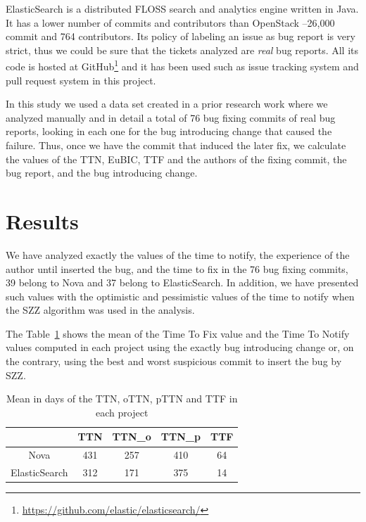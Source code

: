 \documentclass[10pt, conference]{IEEEtran}
\begin{document}
ElasticSearch is a distributed FLOSS search and analytics engine written in Java. It has a lower number of commits and contributors than OpenStack --26,000 commit and 764 contributors. Its policy of labeling an issue as bug report is very strict, thus we could be sure that the tickets analyzed are \emph{real} bug reports. All its code is hosted at GitHub\footnote{\url{https://github.com/elastic/elasticsearch/}} and it has been used such as issue tracking system and pull request system in this project.

In this study we used a data set created in a prior research work where we analyzed manually and in detail a total of 76 bug fixing commits of real bug reports, looking in each one for the bug introducing change that caused the failure. Thus, once we have the commit that induced the later fix, we calculate the values of the TTN, EuBIC, TTF and the authors of the fixing commit, the bug report, and the bug introducing change.  


\section{Results}
\label{sec:results}

We have analyzed exactly the values of the time to notify, the experience of the author until inserted the bug, and the time to fix in the 76 bug fixing commits, 39 belong to Nova and 37 belong to ElasticSearch. In addition, we have presented such values with the optimistic and pessimistic values of the time to notify when the SZZ algorithm was used in the analysis.

The Table~\ref{table} shows the mean of the Time To Fix value and the Time To Notify values computed in each project using the exactly bug introducing change or, on the contrary, using the best and worst suspicious commit to insert the bug by SZZ.  
\begin{table}[!t]
\renewcommand{\arraystretch}{1.3}
\label{table}
\centering
\caption{Mean in days of the TTN, oTTN, pTTN and TTF in each project}
\begin{tabular}{|c||c||c||c||c| }
\hline
  & TTN & TTN\_o & TTN\_p & TTF \\
\hline
Nova & 431 & 257 & 410 & 64 \\
\hline
ElasticSearch & 312 & 171 & 375 & 14\\
\hline
\end{tabular}
\end{table}
\end{document}
